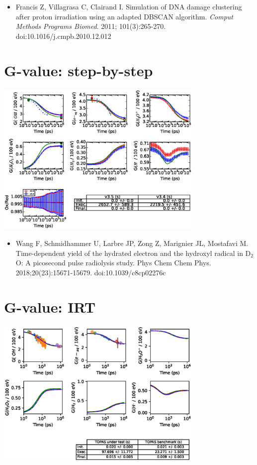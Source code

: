 \documentclass[aspectratio=1610]{beamer}
\begin{document}
\begin{frame}{\secname}
\begin{columns}
\begin{column}{0.6\linewidth}
  \end{column}
 \end{columns}
\begin{itemize}
\item \tiny{Francis Z, Villagrasa C, Clairand I. Simulation of DNA damage clustering after proton irradiation using an adapted DBSCAN algorithm. \textit{Comput Methods Programs Biomed}. 2011; 101(3):265-270. doi:10.1016/j.cmpb.2010.12.012}
\end{itemize}
\end{frame}

\section{G-value: step-by-step}

\begin{frame}{\secname}
 \centering
   \includegraphics[width=0.75\textwidth]{Gvalue}
\begin{itemize}
\item \tiny{Wang F, Schmidhammer U, Larbre JP, Zong Z, Marignier JL, Mostafavi M. Time-dependent yield of the hydrated electron and the hydroxyl radical in D$_{2}$O: A picosecond pulse radiolysis study. Phys Chem Chem Phys. 2018;20(23):15671-15679. doi:10.1039/c8cp02276c}
\end{itemize}
\end{frame}

\section{G-value: IRT}

\begin{frame}{\secname}
 \centering
  \includegraphics[width=0.75\textwidth]{GvalueIRT}
\end{frame}
\end{document}
